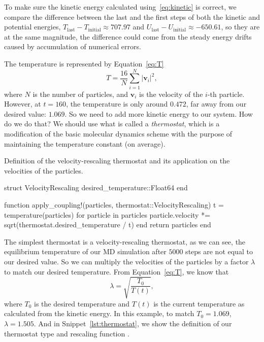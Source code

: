 To make sure the kinetic energy calculated using~\eqref{eq:kinetic} is correct, we compare
the difference between the last and the first steps of both the kinetic and potential
energies, \(T_\text{last} - T_\text{initial} \approx 707.97\) and
\(U_\text{last} - U_\text{initial} \approx -650.61\), so they are at the same magnitude,
the difference could come from the steady energy drifts caused by accumulation of
numerical errors.

The temperature is represented by Equation~\eqref{eq:T}
%
\begin{equation}\label{eq:T}
    T = \frac{ 16 }{ N } \sum_{i=1}^{N} \lvert \bm{v}_i \rvert^2,
\end{equation}
%
where \(N\) is the number of particles, and \(\bm{v}_i\) is the velocity of the \(i\)-th particle.
However, at \(t = 160\), the temperature is only around \(0.472\), far away from our desired
value: \(1.069\). So we need to add more kinetic energy to our system. How do we do that?
We should use what is called a \emph{thermostat}, which is
a modiﬁcation of the basic molecular dynamics scheme with the purpose of maintaining the
temperature constant (on average).

\begin{algorithm}[H]
    \caption{Definition of the velocity-rescaling thermostat and its application
        on the velocities of the particles.}
    \label{lst:thermostat}
    \begin{juliacode}
        struct VelocityRescaling
            desired_temperature::Float64
        end

        function apply_coupling!(particles, thermostat::VelocityRescaling)
            t = temperature(particles)
            for particle in particles
                particle.velocity *= sqrt(thermostat.desired_temperature / t)
            end
            return particles
        end
    \end{juliacode}
\end{algorithm}

The simplest thermostat is a velocity-rescaling thermostat, as we can see, the equilibrium
temperature of our MD simulation after \(5000\) steps are not equal to our desired value.
So we can multiply the velocities of the particles by a factor \(\lambda\) to match our
desired temperature.
From Equation~\ref{eq:T}, we know that
%
\begin{equation}
    \lambda = \sqrt{\frac{ T_0 }{ T(t) }},
\end{equation}
%
where \(T_0\) is the desired temperature and \(T(t)\) is the current temperature as
calculated from the kinetic energy.
In this example, to match \(T_0 = 1.069\), \(\lambda = 1.505\).
And in Snippet~\ref{lst:thermostat}, we show the definition of our thermostat type
 and rescaling function .

